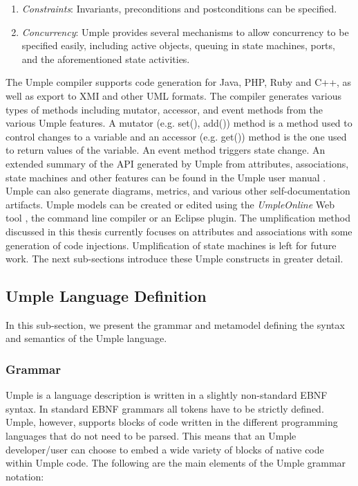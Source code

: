 \begin{enumerate}
 \item 	\textit{Constraints}: Invariants, preconditions and postconditions can be specified.

 \item 	\textit{Concurrency}: Umple provides several mechanisms to allow concurrency to be specified easily, including active objects, queuing in state machines, ports, and the aforementioned state activities.
\end{enumerate}

The Umple compiler supports code generation for Java, PHP, Ruby and C++, as well as export to XMI and other UML formats. The compiler generates various types of methods including mutator, accessor, and event methods from the various Umple features. A mutator (e.g. set(), add()) method is a method used to control changes to a variable and an accessor (e.g. get()) method is the one used to return values of the variable. An event method triggers state change. An extended summary of the API generated by Umple from attributes, associations, state machines and other features can be found in the Umple user manual \cite{UmpleAPI}. Umple can also generate diagrams, metrics, and various other self-documentation artifacts. Umple models can be created or edited using the \textit{UmpleOnline} Web tool \cite{UmpleOnline}, the command line compiler or an Eclipse plugin. 
The umplification method discussed in this thesis currently focuses on attributes and associations with some generation of code injections. Umplification of state machines is left for future work. The next sub-sections introduce these Umple constructs in greater detail.
\subsection{Umple Language Definition}
In this sub-section, we present the grammar and metamodel defining the syntax and semantics of the Umple language. 

\subsubsection{Grammar}

Umple is a language description is written in a slightly non-standard EBNF syntax. In standard EBNF grammars all tokens have to be strictly defined. Umple, however, supports blocks of code written in the different programming languages that do not need to be parsed. This means that an Umple developer/user can choose to embed a wide variety of blocks of native code within Umple code. The following are the main elements of the Umple grammar notation:

